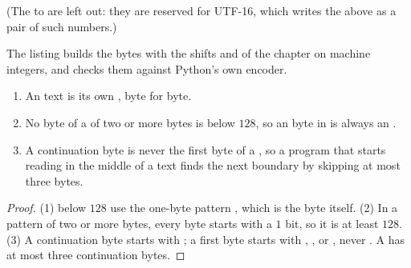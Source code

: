 (The   to  are left out: they are reserved for UTF-16, which writes the  above  as a pair of such numbers.)

The listing builds the bytes with the shifts and  of the chapter on machine integers, and checks them against
Python's own encoder.

%
\label{lst:g10:text-encodings:utf8-by-hand}

\label{out:g10:text-encodings:utf8-by-hand}

\begin{proposition}\label{prop:g10:text-encodings:utf8-properties}
\begin{enumerate}
  \item An  text is its own  , byte for byte.
  \item No byte of a  of two or more bytes is below $128$, so an  byte in  is always an 
    .
  \item A continuation byte is never the first byte of a , so a program that starts reading in the middle
    of a text finds the next  boundary by skipping at most three bytes.
\end{enumerate}
\end{proposition}

\begin{proof}
(1)  below $128$ use the one-byte pattern , which is the  byte itself. (2) In a
pattern of two or more bytes, every byte starts with a $1$ bit, so it is at least $128$. (3) A continuation byte
starts with ; a first byte starts with , ,  or , never . A
 has at most three continuation bytes.
\end{proof}

